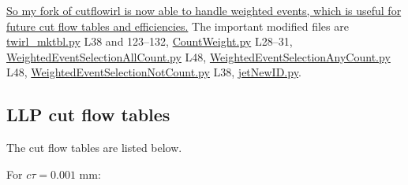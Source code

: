 \uline{So my fork of cutflowirl is now able to handle weighted events, which is useful for future cut flow tables and efficiencies.} The important modified files are \href{run:modules/Sec 30 - Cut flow tables for SUS-16-038listings/cutflowirl/twirl_mktbl.py}{twirl\_mktbl.py} L38 and 123--132, \href{run:modules/Sec 30 - Cut flow tables for SUS-16-038listings/cutflowirl/atlogic/EventSelectionModules/CountWeight.py}{CountWeight.py} L28--31, \href{run:modules/Sec 30 - Cut flow tables for SUS-16-038listings/cutflowirl/atlogic/EventSelectionModules/WeightedEventSelectionAllCount.py}{WeightedEventSelectionAllCount.py} L48, \href{run:modules/Sec 30 - Cut flow tables for SUS-16-038listings/cutflowirl/atlogic/EventSelectionModules/WeightedEventSelectionAnyCount.py}{WeightedEventSelectionAnyCount.py} L48, \href{run:modules/Sec 30 - Cut flow tables for SUS-16-038listings/cutflowirl/atlogic/EventSelectionModules/WeightedEventSelectionNotCount.py}{WeightedEventSelectionNotCount.py} L38, \href{run:modules/Sec 30 - Cut flow tables for SUS-16-038listings/cutflowirl/atlogic/Scribblers/jetNewID.py}{jetNewID.py}.


\subsection{LLP cut flow tables}

The cut flow tables are listed below.

For $c\tau = 0.001$ mm:

